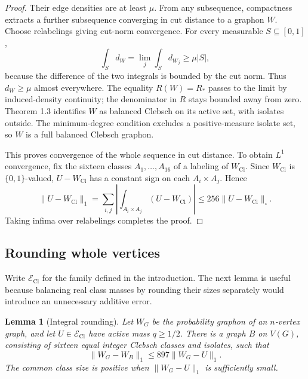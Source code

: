 \documentclass[11pt]{amsart}
\newtheorem{lemma}[theorem]{Lemma}
\theoremstyle{definition}
\theoremstyle{remark}
\begin{document}
\begin{proof}
Their edge densities are at least $\mu$. From any subsequence, compactness
extracts a further subsequence converging in cut distance to a graphon $W$.
Choose relabelings giving cut-norm convergence. For every measurable
$S\subseteq[0,1]$,
\[
 \int_S d_W=\lim_j\int_S d_{W_j}\geq\mu|S|,
\]
because the difference of the two integrals is bounded by the cut norm.
Thus $d_W\geq\mu$ almost everywhere. The equality $R(W)=R_\ast$ passes to
the limit by induced-density continuity; the denominator in $R$ stays
bounded away from zero. Theorem 1.3 identifies $W$ as balanced Clebsch on
its active set, with isolates outside. The minimum-degree condition
excludes a positive-measure isolate set, so $W$ is a full balanced Clebsch
graphon.

This proves convergence of the whole sequence in cut distance. To obtain
$L^1$ convergence, fix the sixteen classes $A_1,\ldots,A_{16}$ of a labeling
of $W_{\mathrm{Cl}}$. Since $W_{\mathrm{Cl}}$ is $\{0,1\}$-valued,
$U-W_{\mathrm{Cl}}$ has a constant sign on each $A_i\times A_j$. Hence
\[
 \|U-W_{\mathrm{Cl}}\|_1
 =\sum_{i,j}\left|\int_{A_i\times A_j}(U-W_{\mathrm{Cl}})\right|
 \leq256\|U-W_{\mathrm{Cl}}\|_\square.
\]
Taking infima over relabelings completes the proof.
\end{proof}

\subsection{Rounding whole vertices}
Write $\mathcal E_{\mathrm{Cl}}$ for the family defined in the introduction.
The next lemma is useful because balancing real class masses by rounding
their sizes separately would introduce an unnecessary additive error.

\begin{lemma}[Integral rounding]\label{lem:integral-rounding}
Let $W_G$ be the probability graphon of an $n$-vertex graph, and let
$U\in\mathcal E_{\mathrm{Cl}}$ have active mass $q\geq1/2$. There is a graph
$B$ on $V(G)$, consisting of sixteen equal integer Clebsch classes and
isolates, such that
\[
 \|W_G-W_B\|_1\leq897\|W_G-U\|_1.
\]
The common class size is positive when $\|W_G-U\|_1$ is sufficiently small.
\end{lemma}
\end{document}
